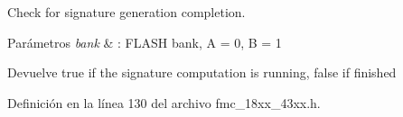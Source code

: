 Check for signature generation completion. 


\begin{DoxyParams}{Parámetros}
{\em bank} & \+: F\+L\+A\+SH bank, A = 0, B = 1 \\
\hline
\end{DoxyParams}
\begin{DoxyReturn}{Devuelve}
true if the signature computation is running, false if finished 
\end{DoxyReturn}


Definición en la línea 130 del archivo fmc\+\_\+18xx\+\_\+43xx.\+h.

